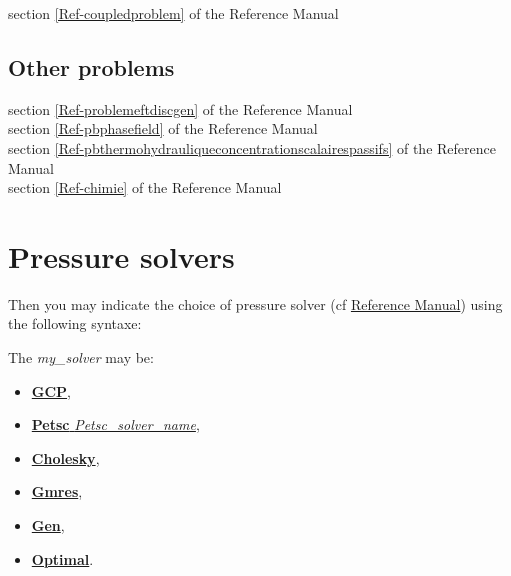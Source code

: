 section \ref{Ref-coupledproblem} of the Reference Manual\\




\subsection{Other problems}
section \ref{Ref-problemeftdiscgen} of the Reference Manual\\

section \ref{Ref-pbphasefield} of the Reference Manual\\

section \ref{Ref-pbthermohydrauliqueconcentrationscalairespassifs} of the Reference Manual\\

section \ref{Ref-chimie} of the Reference Manual\\




\section{Pressure solvers}
Then you may indicate the choice of pressure solver (cf \href{TRUST_Reference_Manual.pdf\#solveursysbase}{\trust Reference Manual}) using the following syntaxe:
    \begin{center}
    \end{center}

The \textit{my\_solver} may be:

\begin{itemize}
\item \href{TRUST_Reference_Manual.pdf\#solvgcp}{\textbf{GCP}},
\item \href{TRUST_Reference_Manual.pdf\#petsc}{\textbf{Petsc} \textit{Petsc\_solver\_name}},
\item \href{TRUST_Reference_Manual.pdf\#cholesky}{\textbf{Cholesky}},
\item \href{TRUST_Reference_Manual.pdf\#gmres}{\textbf{Gmres}},
\item \href{TRUST_Reference_Manual.pdf\#gen}{\textbf{Gen}},
\item \href{TRUST_Reference_Manual.pdf\#optimal}{\textbf{Optimal}}.
\end{itemize}




